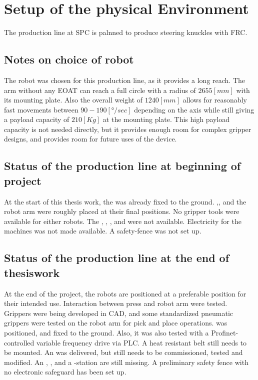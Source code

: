 \chapter{Setup of the physical Environment}
The production line at \ac{SPC} is palnned to produce steering knuckles with \ac{FRC}.



\section{Notes on choice of robot} %
The robot was chosen for this production line, as it provides a long reach. The arm without any \ac{EOAT} can reach a full circle with a radius of $2655 [\textit{mm}]$ with its mounting plate. Also the overall weight of $1240 [\textit{mm}]$ allows for reasonably fast movements between $90-190 [\textit{°/sec}] $ depending on the axis while still giving a payload capacity of $210 [\textit{Kg}]$ at the mounting plate.\cite{210FDatasheet}
This high payload capacity is not needed directly, but it provides enough room for complex gripper designs, and provides room for future uses of the device.

\section{Status of the production line at beginning of project}
At the start of this thesis work, the  was already fixed to the ground. 
,, and the robot arm were roughly placed at their final positions.
No gripper tools were available for either robots.
The , , ,  and  were not available.
Electricity for the machines was not made available.
A safety-fence was not set up.

\section{Status of the production line at the end of thesiswork}
At the end of the project, the robots are positioned at a preferable position for their intended use. Interaction between press and robot arm were tested. Grippers were being developed in \ac{CAD}, and some standardized pneumatic grippers were tested on the robot arm for pick and place operations.  was positioned, and fixed to the ground. Also, it was also tested with a Profinet-controlled variable frequency drive via \ac{PLC}. A heat resistant belt still needs to be mounted. An  was delivered, but still needs to be commissioned, tested and modified. 
An , ,  and a -station are still missing.
A preliminary safety fence with no electronic safeguard has been set up. 


